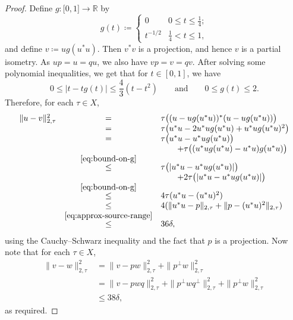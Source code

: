 \documentclass[a4paper,11pt]{amsart}
\theoremstyle{definition}
\numberwithin{equation}{section}
\numberwithin{theorem}{section}
\begin{document}
\begin{proof}
	Define $g \colon \mathbb [0,1] \rightarrow \mathbb R$ by
	\begin{equation}
		g(t) \coloneqq \begin{cases} 0 & 0 \leq t \leq \frac14; \\ t^{-1/2} & \frac14 < t \leq 1, \end{cases}
	\end{equation}
	and define $v \coloneqq u g(u^*u)$.  Then $v^*v$ is a projection, and hence $v$ is a partial isometry.  As $up = u = qu$, we also have $vp = v = qv$.  After solving some polynomial inequalities, we get that for $t \in [0, 1]$, we have 
	\begin{equation}\label{eq:bound-on-g}
		0 \leq |t - tg(t)| \leq \frac{4}{3} (t - t^2) \qquad \text{and} \qquad 0 \leq g(t) \leq 2.
	\end{equation}
	Therefore, for each $\tau \in X$,
	\begin{equation}\begin{array}{rcl}
		\| u - v\|_{2, \tau}^2 
		&=& \tau\big((u - u g(u^*u))^*(u - ug(u^*u))\big) \\
		&=& \tau\big(u^*u - 2u^*ug(u^*u) + u^*ug(u^*u)^2\big) \\
		&=& \tau\big(u^*u - u^*ug(u^*u)\big) \\ &&\qquad + \tau\big((u^*ug(u^*u) - u^*u)g(u^*u)\big) \\
		&\stackrel{\eqref{eq:bound-on-g}}\leq& \tau\big(|u^*u - u^*ug(u^*u)|\big) \\ &&\qquad + 2\tau\big(|u^*u - u^*ug(u^*u)|\big) \\
		&\stackrel{\eqref{eq:bound-on-g}}{\leq}& 4 \tau(u^*u - (u^*u)^2)\\
		&\leq& 4(\|u^*u-p\|_{2,\tau}+\|p-(u^*u)^2\|_{2,\tau})\\
  &\stackrel{\eqref{eq:approx-source-range}}{\leq}& 36\delta,
	\end{array}\end{equation}
	using the Cauchy--Schwarz inequality and the fact that $p$ is a projection.  Now note that for each $\tau \in X$,
 \begin{equation}
 \begin{split}
    \| v - w\|^2_{2, \tau}
    &= \|v- pw\|^2_{2, \tau} + \|p^\perp w\|^2_{2, \tau} \\
    &= \|v -p w q \|^2_{2, \tau} + \| p^\perp w q^\perp \|^2_{2, \tau} + \| p^\perp w\|^2_{2, \tau} \\
    &\leq 38\delta,
\end{split}
 \end{equation}
 as required.
\end{proof}
\end{document}
